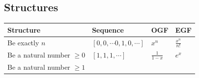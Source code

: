 \hypertarget{structures}{%
\subsection{Structures}\label{structures}}

\begin{longtable}[]{@{}llll@{}}
\toprule
\begin{minipage}[b]{0.22\columnwidth}\raggedright
Structure\strut
\end{minipage} & \begin{minipage}[b]{0.22\columnwidth}\raggedright
Sequence\strut
\end{minipage} & \begin{minipage}[b]{0.22\columnwidth}\raggedright
OGF\strut
\end{minipage} & \begin{minipage}[b]{0.22\columnwidth}\raggedright
EGF\strut
\end{minipage}\tabularnewline
\midrule
\endhead
\begin{minipage}[t]{0.22\columnwidth}\raggedright
Be exactly \(n\)\strut
\end{minipage} & \begin{minipage}[t]{0.22\columnwidth}\raggedright
\([0, 0, \cdots 0, 1, 0, \cdots]\)\strut
\end{minipage} & \begin{minipage}[t]{0.22\columnwidth}\raggedright
\(x^n\)\strut
\end{minipage} & \begin{minipage}[t]{0.22\columnwidth}\raggedright
\(\frac {x^n} {n!}\)\strut
\end{minipage}\tabularnewline
\begin{minipage}[t]{0.22\columnwidth}\raggedright
Be a natural number \(\geq 0\)\strut
\end{minipage} & \begin{minipage}[t]{0.22\columnwidth}\raggedright
\([1,1,1,\cdots]\)\strut
\end{minipage} & \begin{minipage}[t]{0.22\columnwidth}\raggedright
\(\frac 1 {1-x}\)\strut
\end{minipage} & \begin{minipage}[t]{0.22\columnwidth}\raggedright
\(e^x\)\strut
\end{minipage}\tabularnewline
\begin{minipage}[t]{0.22\columnwidth}\raggedright
Be a natural number \(\geq 1\)\strut
\end{minipage} & \begin{minipage}[t]{0.22\columnwidth}\raggedright

\end{minipage}
\end{longtable}
